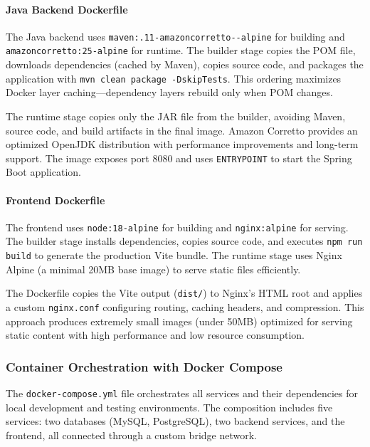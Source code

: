 \documentclass[12pt,a4paper]{article}
\begin{document}
\paragraph{Java Backend Dockerfile}

The Java backend uses \texttt{maven:.11-\allowbreak amazoncorretto--\allowbreak alpine} for building and \texttt{amazoncorretto:25-alpine} for runtime. The builder stage copies the POM file, downloads dependencies (cached by Maven), copies source code, and packages the application with \texttt{mvn clean package -DskipTests}. This ordering maximizes Docker layer caching—dependency layers rebuild only when POM changes.\newline

The runtime stage copies only the JAR file from the builder, avoiding Maven, source code, and build artifacts in the final image. Amazon Corretto provides an optimized OpenJDK distribution with performance improvements and long-term support. The image exposes port 8080 and uses \texttt{ENTRYPOINT} to start the Spring Boot application.

\paragraph{Frontend Dockerfile}

The frontend uses \texttt{node:18-alpine} for building and \texttt{nginx:alpine} for serving. The builder stage installs dependencies, copies source code, and executes \texttt{npm run build} to generate the production Vite bundle. The runtime stage uses Nginx Alpine (a minimal 20MB base image) to serve static files efficiently.\newline

The Dockerfile copies the Vite output (\texttt{dist/}) to Nginx's HTML root and applies a custom \texttt{nginx.conf} configuring routing, caching headers, and compression. This approach produces extremely small images (under 50MB) optimized for serving static content with high performance and low resource consumption.

\subsubsection{Container Orchestration with Docker Compose}

The \texttt{docker-compose.yml} file orchestrates all services and their dependencies for local development and testing environments. The composition includes five services: two databases (MySQL, PostgreSQL), two backend services, and the frontend, all connected through a custom bridge network.\newline
\end{document}
